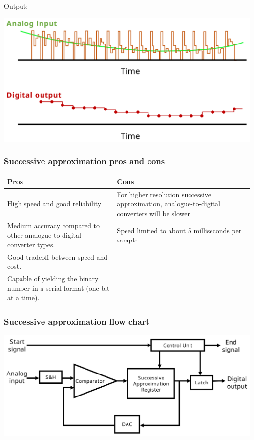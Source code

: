 \documentclass[11pt]{article}
\begin{document}
Output:
\begin{center}
\includegraphics[width=.9\linewidth]{./images/successive-approximation-output.png}
\end{center}
\subsubsection{Successive approximation pros and cons}
\label{sec:org46cec77}
\begin{center}
\begin{tabularx}{\textwidth}{|X|X|}
\hline
Pros & Cons\\
\hline
High speed and good reliability & For higher resolution successive approximation, analogue-to-digital converters will be slower\\
\hline
Medium accuracy compared to other analogue-to-digital converter types. & Speed limited to about 5 milliseconds per sample.\\
\hline
Good tradeoff between speed and cost. & \\
\hline
Capable of yielding the binary number in a serial format (one bit at a time). & \\
\hline
\end{tabularx}
\end{center}
\subsubsection{Successive approximation flow chart}
\label{sec:orgfc40506}
\begin{center}
\includegraphics[width=.9\linewidth]{./images/successive-approximation-flow-chart.png}
\end{center}
\end{document}
